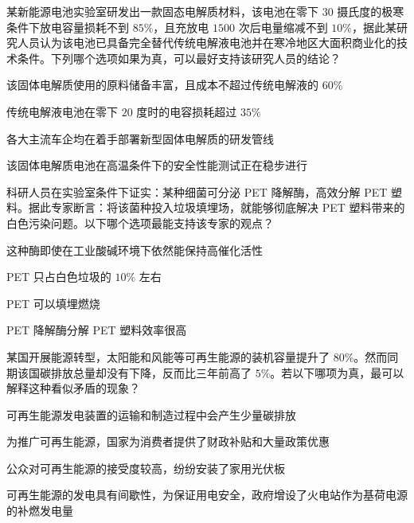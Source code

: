 \documentclass{exam-zh}
\begin{document}
\begin{question}
某新能源电池实验室研发出一款固态电解质材料，该电池在零下 $30$ 摄氏度的极寒条件下放电容量损耗不到 $85\%$，且充放电 $1500$ 次后电量缩减不到 $10\%$，据此某研究人员认为该电池已具备完全替代传统电解液电池并在寒冷地区大面积商业化的技术条件。下列哪个选项如果为真，可以最好支持该研究人员的结论？\paren[]
\begin{choices}
  \item 该固体电解质使用的原料储备丰富，且成本不超过传统电解液的 $60\%$
  \item 传统电解液电池在零下 $20$ 度时的电容损耗超过 $35\%$
  \item 各大主流车企均在着手部署新型固体电解质的研发管线
  \item 该固体电解质电池在高温条件下的安全性能测试正在稳步进行
\end{choices}
\end{question}

\begin{question}
科研人员在实验室条件下证实：某种细菌可分泌 PET 降解酶，高效分解 PET 塑料。据此专家断言：将该菌种投入垃圾填埋场，就能够彻底解决 PET 塑料带来的白色污染问题。以下哪个选项最能支持该专家的观点？\paren[]
\begin{choices}
  \item 这种酶即使在工业酸碱环境下依然能保持高催化活性
  \item PET 只占白色垃圾的 $10\%$ 左右
  \item PET 可以填埋燃烧
  \item PET 降解酶分解 PET 塑料效率很高
\end{choices}
\end{question}

\begin{question}
某国开展能源转型，太阳能和风能等可再生能源的装机容量提升了 $80\%$。然而同期该国碳排放总量却没有下降，反而比三年前高了 $5\%$。若以下哪项为真，最可以解释这种看似矛盾的现象？\paren[]
\begin{choices}
  \item 可再生能源发电装置的运输和制造过程中会产生少量碳排放
  \item 为推广可再生能源，国家为消费者提供了财政补贴和大量政策优惠
  \item 公众对可再生能源的接受度较高，纷纷安装了家用光伏板
  \item 可再生能源的发电具有间歇性，为保证用电安全，政府增设了火电站作为基荷电源的补燃发电量
\end{choices}
\end{question}
\end{document}

